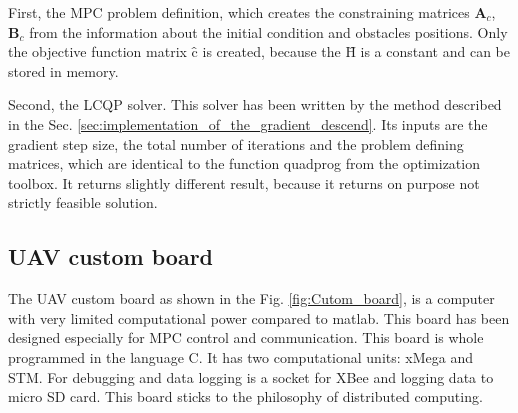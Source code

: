 \documentclass[a4paper,11pt,titlepage]{article}
\newcommand{\macHr}{\textbf{\^H}}
\newcommand{\maccr}{\textbf{\^c}}
\begin{document}
First, the MPC problem definition, which creates the constraining matrices $\textbf{A}_c$, $\textbf{B}_c$ from the information about the initial condition and obstacles positions. Only the objective function matrix $\maccr$ is created, because the $\macHr$ is a constant and can be stored in memory.

Second, the LCQP solver. This solver has been written by the method described in the Sec. \ref{sec:implementation_of_the_gradient_descend}. Its inputs are the gradient step size, the total number of iterations and the problem defining matrices, which are identical to the function quadprog from the optimization toolbox. It returns slightly different result, because it returns on purpose not strictly feasible solution. 



\subsection{UAV custom board}
\label{sec:custom_board}
The UAV custom board \cite{tomas} as shown in the Fig. \ref{fig:Cutom_board}, is a computer with very limited computational power compared to matlab. This board has been designed \cite{tomas} especially for MPC control and communication. This board is whole programmed in the language C. It has two computational units: xMega and STM. For debugging and data logging is a socket for XBee and logging data to micro SD card. This board sticks to the philosophy of distributed computing.
\end{document}
